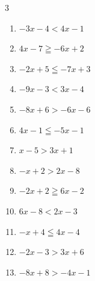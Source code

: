 \begin{multicols}{3}
\begin{enumerate}

  \item $-3x-4<4x-1$


  \item $4x-7\geqq -6x+2$


  \item $-2x+5\leqq -7x+3$


  \item $-9x-3<3x-4$


  \item $-8x+6>-6x-6$

        \phantom{$\displaystyle x<6$}

  \item $4x-1\leqq -5x-1$

        \phantom{$\displaystyle x\leqq 0$}

  \item $x-5>3x+1$

        \phantom{$\displaystyle x<-3$}

  \item $-x+2>2x-8$


  \item $-2x+2\geqq 6x-2$


  \item $6x-8<2x-3$


\columnbreak %

  \item $-x+4\leqq 4x-4$


  \item $-2x-3>3x+6$


  \item $-8x+8>-4x-1$



\end{enumerate}
\end{multicols}
